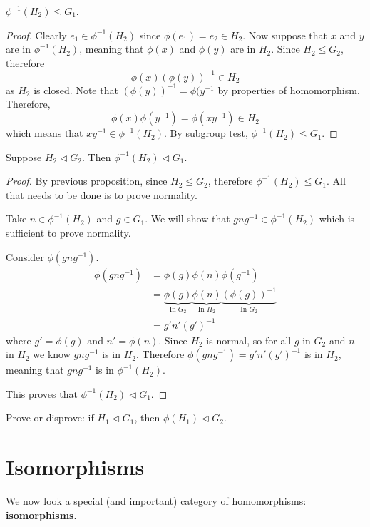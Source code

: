 \begin{proposition}\label{prop-homomorphism-inverse-is-subgroup}
    $\phi^{-1}(H_2) \leq G_1$.
\end{proposition}
\begin{proof}
    Clearly $e_1 \in \phi^{-1}(H_2)$ since $\phi(e_1) = e_2 \in H_2$. Now suppose that $x$ and $y$ are in $\phi^{-1}(H_2)$, meaning that $\phi(x)$ and $\phi(y)$ are in $H_2$. Since $H_2 \leq G_2$, therefore
    \[
        \phi(x)\left(\phi(y)\right)^{-1} \in H_2
    \]
    as $H_2$ is closed. Note that $\left(\phi(y)\right)^{-1} = \phi(y^{-1}$ by properties of homomorphism. Therefore,
    \[
        \phi(x)\phi(y^{-1}) = \phi(xy^{-1}) \in H_2
    \]
    which means that $xy^{-1} \in \phi^{-1}(H_2)$. By subgroup test, $\phi^{-1}(H_2) \leq G_1$.
\end{proof}

\begin{proposition}
    Suppose $H_2 \lhd G_2$. Then $\phi^{-1}(H_2) \lhd G_1$.
\end{proposition}
\begin{proof}
    By previous proposition, since $H_2 \leq G_2$, therefore $\phi^{-1}(H_2) \leq G_1$. All that needs to be done is to prove normality.

    Take $n \in \phi^{-1}(H_2)$ and $g \in G_1$. We will show that $gng^{-1} \in \phi^{-1}(H_2)$ which is sufficient to prove normality.

    Consider $\phi(gng^{-1})$.
    \begin{align*}
        \phi(gng^{-1}) &= \phi(g)\phi(n)\phi(g^{-1}) \\
        &= \underbrace{\phi(g)}_{\text{In }G_2} \underbrace{\phi(n)}_{\text{In }H_2} \underbrace{\left(\phi(g)\right)^{-1}}_{\text{In }G_2}\\
        &= g'n'(g')^{-1}
    \end{align*}
    where $g' = \phi(g)$ and $n' = \phi(n)$. Since $H_2$ is normal, so for all $g$ in $G_2$ and $n$ in $H_2$ we know $gng^{-1}$ is in $H_2$. Therefore $\phi(gng^{-1}) = g'n'(g')^{-1}$ is in $H_2$, meaning that $gng^{-1}$ is in $\phi^{-1}(H_2)$.

    This proves that $\phi^{-1}(H_2) \lhd G_1$.
\end{proof}

\begin{exercise}
    Prove or disprove: if $H_1 \lhd G_1$, then $\phi(H_1) \lhd G_2$.
\end{exercise}

\section{Isomorphisms}
We now look a special (and important) category of homomorphisms: \textbf{isomorphisms}.

